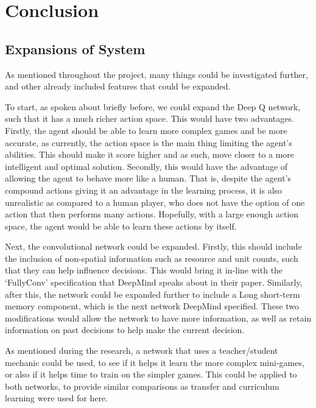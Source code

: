 \chapter{Conclusion}%
\label{conclusion}

\section{Expansions of System}

As mentioned throughout the project, many things could be investigated further,
and other already included features that could be expanded.

To start, as spoken about briefly before, we could expand the Deep Q network,
such that it has a much richer action space. This would have two advantages.
Firstly, the agent should be able to learn more complex games and be more
accurate, as currently, the action space is the main thing limiting the agent's
abilities. This should make it score higher and as such, move closer to a more
intelligent and optimal solution. Secondly, this would have the advantage of
allowing the agent to behave more like a human. That is, despite the agent's
compound actions giving it an advantage in the learning process, it is also
unrealistic as compared to a human player, who does not have the option of one
action that then performs many actions. Hopefully, with a large enough action
space, the agent would be able to learn these actions by itself.

Next, the convolutional network could be expanded. Firstly, this should include
the inclusion of non-spatial information such as resource and unit counts, such
that they can help influence decisions. This would bring it in-line with the
`FullyConv' specification that DeepMind speaks about in their paper. Similarly,
after this, the network could be expanded further to include a Long short-term
memory component, which is the next network DeepMind specified. These two
modifications would allow the network to have more information, as well as
retain information on past decisions to help make the current decision.

As mentioned during the research, a network that uses a teacher/student mechanic
could be used, to see if it helps it learn the more complex mini-games, or also
if it helps time to train on the simpler games. This could be applied to both
networks, to provide similar comparisons as transfer and curriculum learning were
used for here.

